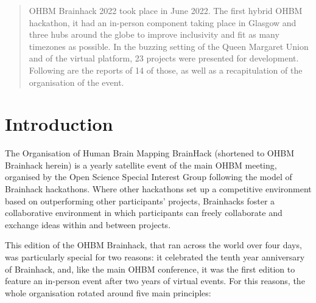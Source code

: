 \documentclass[12pt,a4paper]{proc}
\let\Oldsection\section
\renewcommand{\section}{\FloatBarrier\Oldsection}
\begin{document}
\vspace{-0.25in} %
{\let\newpage\relax\maketitle} %
\vspace{-1in} %



\begin{abstract}
OHBM Brainhack 2022 took place in June 2022. The first hybrid OHBM hackathon, it had an in-person component taking place in Glasgow and three hubs around the globe to improve inclusivity and fit as many timezones as possible.
In the buzzing setting of the Queen Margaret Union and of the virtual platform, 23 projects were presented for development.
Following are the reports of 14 of those, as well as a recapitulation of the organisation of the event. 
\end{abstract}

\section*{Introduction}

The Organisation of Human Brain Mapping BrainHack (shortened to OHBM
Brainhack herein) is a yearly satellite event of the main OHBM
meeting, organised by the Open Science Special Interest Group following
the model of Brainhack hackathons\cite{Gau2021}.
Where other hackathons set up a competitive environment based on
outperforming other participants' projects, Brainhacks foster a
collaborative environment in which participants can freely collaborate
and exchange ideas within and between projects.

This edition of the OHBM Brainhack, that ran across the world over four
days, was particularly special for two reasons: it celebrated the tenth
year anniversary of Brainhack, and, like the main OHBM conference, it
was the first edition to feature an in-person event after two years of
virtual events. For this reasons, the whole organisation rotated around
five main principles:
\end{document}
